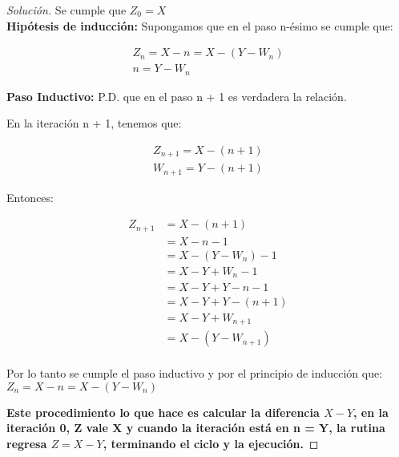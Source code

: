 \begin{proof}[Solución]
  Se cumple que $Z_0 = X$\\
  \textbf{Hipótesis de inducción:} Supongamos que en el paso n-ésimo
  se cumple que:

  \begin{equation}
    \begin{split}
        Z_n = X - n = X - (Y - W_n) \\
        n = Y - W_n
    \end{split}
  \end{equation}

  \textbf{Paso Inductivo:} P.D. que en el paso n + 1 es verdadera la
  relación.

  En la iteración n + 1, tenemos que:

  \begin{equation*}
    \begin{split}
      Z_{n+1} = X - (n + 1)\\
      W_{n+1} = Y - (n + 1)
    \end{split}
  \end{equation*}

  Entonces:

  \begin{equation*}
    \begin{split}
      Z_{n + 1} & = X - (n + 1)\\
      & = X - n - 1\\
      & = X - (Y - W_n) - 1\\
      & = X - Y + W_n - 1\\
      & = X - Y + Y - n - 1\\
      & = X - Y + Y - (n + 1)\\
      & = X - Y + W_{n + 1}\\
      & = X - (Y - W_{n + 1})\\
    \end{split}
  \end{equation*}

  Por lo tanto se cumple el paso inductivo y por el principio de
  inducción que: $Z_n = X - n = X - (Y - W_n)$

  \textbf{Este procedimiento lo que hace es calcular la diferencia $X
    - Y$, en la iteración 0, Z vale X y cuando la iteración está en n
    = Y, la rutina regresa $Z = X - Y$, terminando el ciclo y la
    ejecución.}

\end{proof}
